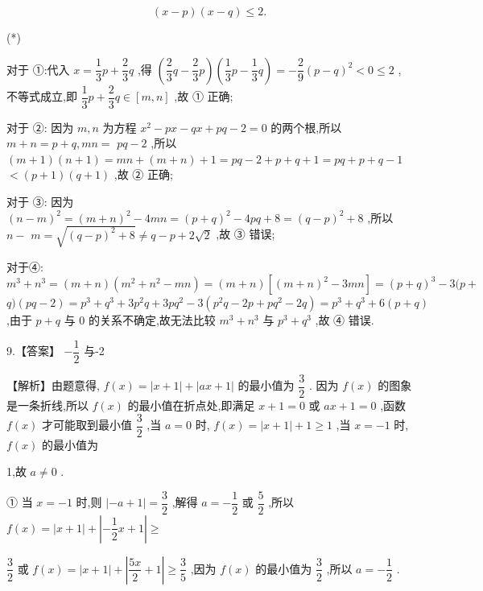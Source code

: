 \documentclass[10pt]{article}
\begin{document}
\[
\left( {x - p}\right) \left( {x - q}\right)  \leq  2.
\]

(*)

对于 ①:代入 $x = \dfrac{1}{3}p + \dfrac{2}{3}q$ ,得 $\left( {\dfrac{2}{3}q - \dfrac{2}{3}p}\right) \left( {\dfrac{1}{3}p - \dfrac{1}{3}q}\right)  =  - \dfrac{2}{9}{\left( p - q\right) }^{2} < 0 \leq  2$ ,不等式成立,即 $\dfrac{1}{3}p + \dfrac{2}{3}q \in  \left\lbrack  {m,n}\right\rbrack$ ,故 ① 正确;

对于 ②: 因为 $m,n$ 为方程 ${x}^{2} - {px} - {qx} + {pq} - 2 = 0$ 的两个根,所以 $m + n = p + q,{mn} =$  ${pq} - 2$ ,所以 $\left( {m + 1}\right) \left( {n + 1}\right)  = {mn} + \left( {m + n}\right)  + 1 = {pq} - 2 + p + q + 1 = {pq} + p + q - 1$  $< \left( {p + 1}\right) \left( {q + 1}\right)$ ,故 ② 正确;

对于 ③: 因为 ${\left( n - m\right) }^{2} = {\left( m + n\right) }^{2} - {4mn} = {\left( p + q\right) }^{2} - {4pq} + 8 = {\left( q - p\right) }^{2} + 8$ ,所以 $n -$  $m = \sqrt{{\left( q - p\right) }^{2} + 8} \neq  q - p + 2\sqrt{2}$ ,故 ③ 错误;

对于④: ${m}^{3} + {n}^{3} = \left( {m + n}\right) \left( {{m}^{2} + {n}^{2} - {mn}}\right)  = \left( {m + n}\right) \left\lbrack  {{\left( m + n\right) }^{2} - {3mn}}\right\rbrack   = {\left( p + q\right) }^{3} - 3(p +$  $q)\left( {{pq} - 2}\right)  = {p}^{3} + {q}^{3} + 3{p}^{2}q + {3p}{q}^{2} - 3\left( {{p}^{2}q - {2p} + p{q}^{2} - {2q}}\right)  = {p}^{3} + {q}^{3} + 6\left( {p + q}\right)$ ,由于 $p + q$ 与 0 的关系不确定,故无法比较 ${m}^{3} + {n}^{3}$ 与 ${p}^{3} + {q}^{3}$ ,故 ④ 错误.

9.【答案】 $- \dfrac{1}{2}$ 与-2

【解析】由题意得, $f\left( x\right)  = \left| {x + 1}\right|  + \left| {{ax} + 1}\right|$ 的最小值为 $\dfrac{3}{2}$ . 因为 $f\left( x\right)$ 的图象是一条折线,所以 $f\left( x\right)$ 的最小值在折点处,即满足 $x + 1 = 0$ 或 ${ax} + 1 = 0$ ,函数 $f\left( x\right)$ 才可能取到最小值 $\dfrac{3}{2}$ ,当 $a = 0$ 时, $f\left( x\right)  = \left| {x + 1}\right|  + 1 \geq  1$ ,当 $x =  - 1$ 时, $f\left( x\right)$ 的最小值为

1,故 $a \neq  0$ .

① 当 $x =  - 1$ 时,则 $\left| {-a + 1}\right|  = \dfrac{3}{2}$ ,解得 $a =  - \dfrac{1}{2}$ 或 $\dfrac{5}{2}$ ,所以 $f\left( x\right)  = \left| {x + 1}\right|  + \left| {-\dfrac{1}{2}x + 1}\right|  \geq$

$\dfrac{3}{2}$ 或 $f\left( x\right)  = \left| {x + 1}\right|  + \left| {\dfrac{5x}{2} + 1}\right|  \geq  \dfrac{3}{5}$ ,因为 $f\left( x\right)$ 的最小值为 $\dfrac{3}{2}$ ,所以 $a =  - \dfrac{1}{2}$ .
\end{document}
